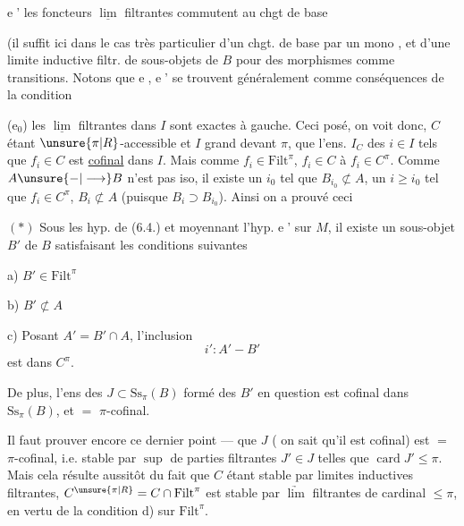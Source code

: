 \textcircled{e'} les foncteurs $\underline{\lim}$ filtrantes commutent au chgt de base  

(il  suffit ici dans le cas très particulier d'un chgt. de base par un mono , et d'une limite inductive filtr. de sous-objets de $B$ pour des morphismes  comme transitions. Notons que \textcircled{e}, \textcircled{e'} se trouvent généralement comme conséquences de la condition

(e$_0$) les $\underline{\lim}$ filtrantes dans $I$ sont exactes à gauche.
Ceci posé, on voit donc, $C$ étant $\unsure{\pi|R}$-accessible et $I$ grand devant $\pi$, que l'ens. $I_C$ des $i\in I$ tels que $f_i\in C$ est \uline{cofinal} dans $I$. Mais  comme $f_i\in\mathrm{Filt}^\pi$, $f_i\in C$  à $f_i\in C^\pi$. Comme $A\unsure{-|\longrightarrow}B$ n'est pas iso, il existe un $i_0$ tel que $B_{i_0}\not\subset A$,   un $i\geq i_0$ tel que $f_i\in C^\pi$,  $B_i\not\subset A$ (puisque $B_i\supset B_{i_0}$). Ainsi on a prouvé ceci

$(\ast)$ Sous les hyp. de (6.4.) et moyennant l'hyp. \textcircled{e'} sur $M$, il existe un sous-objet $B'$ de $B$ satisfaisant les conditions suivantes

a) $B'\in\mathrm{Filt}^\pi$

b) $B'\not\subset A$

c) Posant $A'=B'\cap A$, l'inclusion
\[
 i':A'-B'
\]
est dans $C^\pi$.

De plus, l'ens des $J\subset\mathrm{Ss}_\pi(B)$ formé des $B'$ en question est cofinal dans $\mathrm{Ss}_\pi(B)$, et $=$ $\pi$-cofinal.

Il faut prouver encore ce dernier point --- que $J$ ( on sait qu'il est cofinal) est $=$ $\pi$-cofinal,  i.e. stable par $\sup$  de  parties filtrantes $J'\in J$ telles que $\operatorname{card}J'\leq\pi$. Mais cela résulte aussitôt du fait que $C$ étant stable par
limites inductives filtrantes, $C^{\unsure{\pi|R}}=C\cap\mathrm{Filt}^\pi$ est stable par $\underrightarrow{\lim}$ filtrantes de cardinal $\leq\pi$, en vertu de la condition d) sur $\mathrm{Filt}^\pi$.

